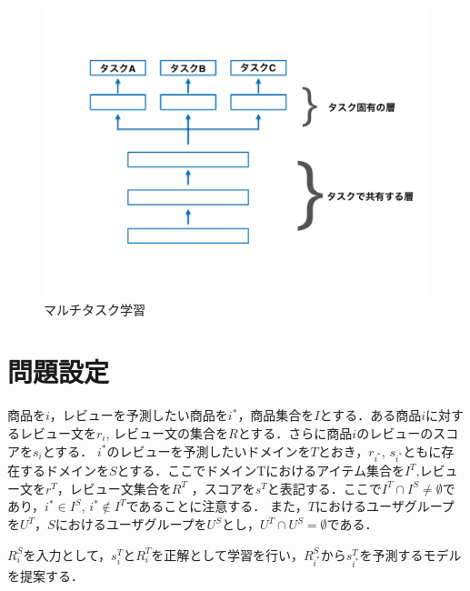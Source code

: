 \documentclass[dvipdfmx,twocolumn,10.5pt]{jsarticle}
\begin{document}
\begin{figure}[tb]
	\centering
	\includegraphics[width=\linewidth]{images/multitask_learning_example.pdf} 
	\caption{マルチタスク学習}
	\label{multitask_learning}
\end{figure}

\section{問題設定}
商品を$i$，レビューを予測したい商品を$i^*$，商品集合を$I$とする．ある商品$i$に対するレビュー文を$r_i$, レビュー文の集合を$R$とする．さらに商品$i$のレビューのスコアを$s_i$とする．
$i^*$のレビューを予測したいドメインを$T$とおき，$r_{i^*}$, $s_{i^*}$ともに存在するドメインを$S$とする．ここでドメインTにおけるアイテム集合を$I^T$,レビュー文を$r^T$，レビュー文集合を$R^T$ ，スコアを$s^T$と表記する．ここで$I^T \cap I^S \neq \emptyset$であり，$i^* \in I^S$, $i^* \notin I^T$であることに注意する．
また，$T$におけるユーザグループを$U^T$，$S$におけるユーザグループを$U^S$とし，$U^T \cap U^S = \emptyset $である．

$R^S_i$を入力として，$s^T_i$と$R^T_i$を正解として学習を行い，$R^S_{i^*}$から$s^T_{i^*}$を予測するモデルを提案する．
\end{document}
